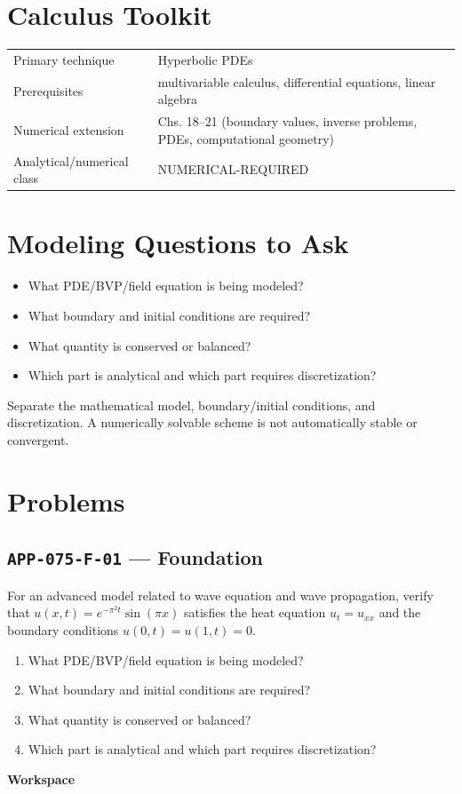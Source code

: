 \documentclass[11pt]{book}
\newcommand{\pid}[1]{\texttt{#1}}
\newcommand{\workspace}{\par\vspace{0.7in}\hrulefill\par\vspace{0.55in}\hrulefill\par}
\begin{document}
\section*{Calculus Toolkit}
\begin{tabularx}{\textwidth}{@{}lX@{}}\toprule
Primary technique & Hyperbolic PDEs \\
Prerequisites & multivariable calculus, differential equations, linear algebra \\
Numerical extension & Chs. 18–21 (boundary values, inverse problems, PDEs, computational geometry) \\
Analytical/numerical class & NUMERICAL-REQUIRED \\
\bottomrule\end{tabularx}
\section*{Modeling Questions to Ask}\begin{itemize}
\item What PDE/BVP/field equation is being modeled?
\item What boundary and initial conditions are required?
\item What quantity is conserved or balanced?
\item Which part is analytical and which part requires discretization?
\end{itemize}
\begin{errorbox}Separate the mathematical model, boundary/initial conditions, and discretization. A numerically solvable scheme is not automatically stable or convergent.\end{errorbox}
\section*{Problems}
\subsection*{\pid{APP-075-F-01} — Foundation}
\begin{problembox}
For an advanced model related to wave equation and wave propagation, verify that $u(x,t)=e^{-\pi^2t}\sin(\pi x)$ satisfies the heat equation $u_t=u_{xx}$ and the boundary conditions $u(0,t)=u(1,t)=0$.
\end{problembox}
\begin{promptbox}\begin{enumerate}
\item What PDE/BVP/field equation is being modeled?
\item What boundary and initial conditions are required?
\item What quantity is conserved or balanced?
\item Which part is analytical and which part requires discretization?
\end{enumerate}\end{promptbox}
\textbf{Workspace}\workspace
{}
\end{document}
